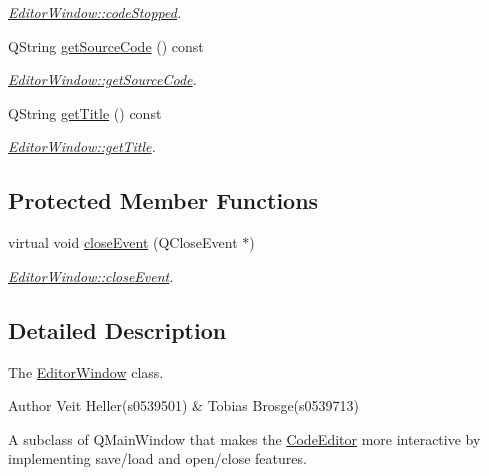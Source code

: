 \begin{DoxyCompactItemize}
\begin{DoxyCompactList}\small\item\em \hyperlink{classEditorWindow_a03cc1e6ae0c550c6f5fff486eaf6b508}{Editor\+Window\+::code\+Stopped}. \end{DoxyCompactList}\item 
Q\+String \hyperlink{classEditorWindow_a4f42ffd31afc2a5e312f49048eab82ad}{get\+Source\+Code} () const 
\begin{DoxyCompactList}\small\item\em \hyperlink{classEditorWindow_a4f42ffd31afc2a5e312f49048eab82ad}{Editor\+Window\+::get\+Source\+Code}. \end{DoxyCompactList}\item 
Q\+String \hyperlink{classEditorWindow_a73910f42d7ffc26999f2d985fdc78686}{get\+Title} () const 
\begin{DoxyCompactList}\small\item\em \hyperlink{classEditorWindow_a73910f42d7ffc26999f2d985fdc78686}{Editor\+Window\+::get\+Title}. \end{DoxyCompactList}\end{DoxyCompactItemize}
\subsection*{Protected Member Functions}
\begin{DoxyCompactItemize}
\item 
virtual void \hyperlink{classEditorWindow_a70f0ac46ae9cd0362e1c4b80322c5fd6}{close\+Event} (Q\+Close\+Event $\ast$)
\begin{DoxyCompactList}\small\item\em \hyperlink{classEditorWindow_a70f0ac46ae9cd0362e1c4b80322c5fd6}{Editor\+Window\+::close\+Event}. \end{DoxyCompactList}\end{DoxyCompactItemize}


\subsection{Detailed Description}
The \hyperlink{classEditorWindow}{Editor\+Window} class. 

\begin{DoxyAuthor}{Author}
Veit Heller(s0539501) \& Tobias Brosge(s0539713)
\end{DoxyAuthor}
A subclass of Q\+Main\+Window that makes the \hyperlink{classCodeEditor}{Code\+Editor} more interactive by implementing save/load and open/close features. 

